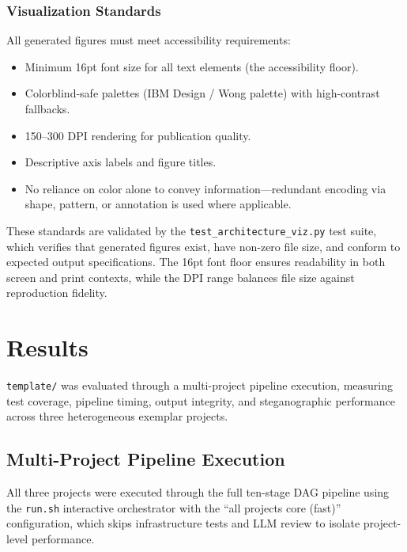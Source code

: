 \documentclass[
]{article}
\providecommand{\tightlist}{%
  \setlength{\itemsep}{0pt}\setlength{\parskip}{0pt}}
\begin{document}
\subsubsection{Visualization Standards}\label{visualization-standards}

All generated figures must meet accessibility requirements:

\begin{itemize}
\tightlist
\item
  Minimum 16pt font size for all text elements (the accessibility
  floor).
\item
  Colorblind-safe palettes (IBM Design / Wong palette) with
  high-contrast fallbacks.
\item
  150--300 DPI rendering for publication quality.
\item
  Descriptive axis labels and figure titles.
\item
  No reliance on color alone to convey information---redundant encoding
  via shape, pattern, or annotation is used where applicable.
\end{itemize}

These standards are validated by the \texttt{test\_architecture\_viz.py}
test suite, which verifies that generated figures exist, have non-zero
file size, and conform to expected output specifications. The 16pt font
floor ensures readability in both screen and print contexts, while the
DPI range balances file size against reproduction fidelity.

\newpage

\section{Results}\label{results}

\texttt{template/} was evaluated through a multi-project pipeline
execution, measuring test coverage, pipeline timing, output integrity,
and steganographic performance across three heterogeneous exemplar
projects.

\subsection{Multi-Project Pipeline
Execution}\label{multi-project-pipeline-execution}

All three projects were executed through the full ten-stage DAG pipeline
using the \texttt{run.sh} interactive orchestrator with the ``all
projects core (fast)'' configuration, which skips infrastructure tests
and LLM review to isolate project-level performance.
\end{document}
